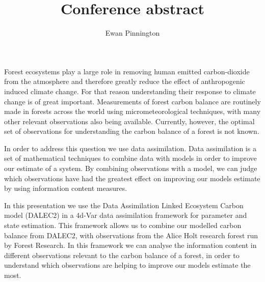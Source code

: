\documentclass[11pt]{article}
\title{Conference abstract}
\author{Ewan Pinnington}
\begin{document}
\maketitle

Forest ecosystems play a large role in removing human emitted carbon-dioxide from the atmosphere and therefore greatly reduce the effect of anthropogenic induced climate change. For that reason understanding their response to climate change is of great important. Measurements of forest carbon balance are routinely made in forests across the world using micrometeorological techniques, with many other relevant observations also being available. Currently, however, the optimal set of observations for understanding the carbon balance of a forest is not known.

In order to address this question we use data assimilation. Data assimilation is a set of mathematical techniques to combine data with models in order to improve our estimate of a system. By combining observations with a model, we can judge which observations have had the greatest effect on improving our models estimate by using information content measures.

In this presentation we use the Data Assimilation Linked Ecosystem Carbon model (DALEC2) in a 4d-Var data assimilation framework for parameter and state estimation. This framework allows us to combine our modelled carbon balance from DALEC2, with observations from the Alice Holt research forest run by Forest Research. In this framework we can analyse the information content in different observations relevant to the carbon balance of a forest, in order to understand which observations are helping to improve our models estimate the most. 
\end{document}

